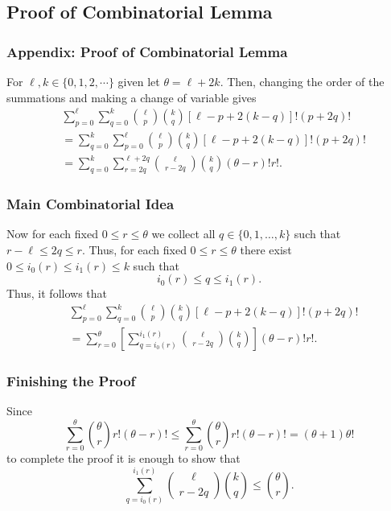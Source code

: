 \documentclass{beamer}
\numberwithin{equation}{section}
\begin{document}
\subsection{Proof of Combinatorial Lemma} 
\label{ssec:proof-comb}
\begin{frame}
  \frametitle{Appendix: Proof of Combinatorial Lemma}
 For $\ell, k\in \{0,1,2,\cdots\}$  given
let  $\theta=\ell+2k$. Then, changing the order of
the summations and making a change of variable gives
%
%
\begin{equation*}
\begin{split}
&\sum_{p=0}^{\ell}
\sum_{q=0}^{k}\binom{\ell}{p}\binom{k}{q}[\ell-p+2(k-q)]!
(p+2q)!\\
&=\sum_{q=0}^{k}\sum_{p=0}^{\ell}\binom{\ell}{p}\binom{k}{q}[\ell-p+2(k-q)]!
(p+2q)!\\
&= \sum_{q=0}^{k}\sum_{r=2q}^{\ell
+2q}\binom{\ell}{r-2q}\binom{k}{q}(\theta-r)! r!.
\end{split}
\end{equation*}
%
\end{frame}
\begin{frame}
  \frametitle{Main Combinatorial Idea}
Now for each fixed $0\le r \le \theta$ we collect all $q\in
\{0,1,\ldots,k\}$ such that $r-\ell  \le 2q \le r$. Thus, for each
fixed $0\le r \le \theta$ there exist $0\le i_0(r)\le i_1(r)\le k$ such
that
%
\[i_0(r)\le q \le i_1(r).\]
%
%
%
Thus, it follows that
\begin{equation*}
\begin{split}
&\sum_{p=0}^{\ell}
\sum_{q=0}^{k}\binom{\ell}{p}\binom{k}{q}[\ell-p+2(k-q)]!
(p+2q)!\\
&= \sum_{r=0}^\theta \left [\sum_{q=i_0(r)}^{i_1(r)}
\binom{\ell}{r-2q}\binom{k}{q}\right](\theta-r)!
r!.
\end{split}
\end{equation*}
\end{frame}
%
%
\begin{frame}
  \frametitle{Finishing the Proof}
Since
\begin{equation*}
\sum_{r=0}^{\theta}\binom{\theta}{r}r! (\theta-r)! \le
\sum_{r=0}^{\theta}\binom{\theta}{r} r! (\theta-r)!
=(\theta+1)\theta!
\end{equation*}
to complete the proof it is enough to show that
%
\begin{equation*}
 \sum_{
q=i_0(r)}^{i_1(r)}\binom{\ell}{r-2q}\binom{k}{q} \le
\binom{\theta}{r}.
\end{equation*}
%
\end{frame}
%
%
\end{document}
